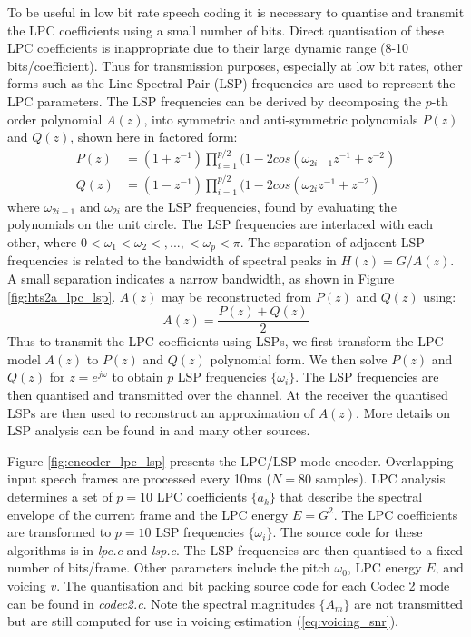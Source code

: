 \documentclass{article}
\begin{document}
{To be useful in low bit rate speech coding it is necessary to quantise and transmit the LPC coefficients using a small number of bits. Direct quantisation of these LPC coefficients is inappropriate due to their large dynamic range (8-10 bits/coefficient). Thus for transmission purposes, especially at low bit rates, other forms such as the Line Spectral Pair (LSP) \cite{itakura1975line} frequencies are used to represent the LPC parameters. The LSP frequencies can be derived by decomposing the $p$-th order polynomial $A(z)$, into symmetric and anti-symmetric polynomials $P(z)$ and $Q(z)$, shown here in factored form:
\begin{equation}
\begin{split}
P(z) &= (1+z^{-1}) \prod_{i=1}^{p/2} (1 - 2cos(\omega_{2i-1} z^{-1} + z^{-2} ) \\
Q(z) &= (1-z^{-1}) \prod_{i=1}^{p/2} (1 - 2cos(\omega_{2i} z^{-1} + z^{-2} )
\end{split}
\end{equation}
where $\omega_{2i-1}$ and $\omega_{2i}$ are the LSP frequencies, found by evaluating the polynomials on the unit circle. The LSP frequencies are interlaced with each other, where $0<\omega_1 < \omega_2 <,..., < \omega_p < \pi$. The separation of adjacent LSP frequencies is related to the bandwidth of spectral peaks in $H(z)=G/A(z)$. A small separation indicates a narrow bandwidth, as shown in Figure \ref{fig:hts2a_lpc_lsp}. $A(z)$ may be reconstructed from $P(z)$ and $Q(z)$ using:
\begin{equation}
A(z) = \frac{P(z)+Q(z)}{2}
\end{equation}
Thus to transmit the LPC coefficients using LSPs, we first transform the LPC model $A(z)$ to $P(z)$ and $Q(z)$ polynomial form. We then solve $P(z)$ and $Q(z)$ for $z=e^{j \omega}$ to obtain $p$ LSP frequencies $\{\omega_i\}$. The LSP frequencies are then quantised and transmitted over the channel. At the receiver the quantised LSPs are then used to reconstruct an approximation of $A(z)$.  More details on LSP analysis can be found in \cite{rowe1997techniques} and many other sources.

Figure \ref{fig:encoder_lpc_lsp} presents the LPC/LSP mode encoder. Overlapping input speech frames are processed every 10ms ($N=80$ samples).  LPC analysis determines a set of $p=10$ LPC coefficients $\{a_k\}$ that describe the spectral envelope of the current frame and the LPC energy $E=G^2$. The LPC coefficients are transformed to $p=10$ LSP frequencies $\{\omega_i\}$. The source code for these algorithms is in \emph{lpc.c} and \emph{lsp.c}.  The LSP frequencies are then quantised to a fixed number of bits/frame.  Other parameters include the pitch $\omega_0$, LPC energy $E$, and voicing $v$.  The quantisation and bit packing source code for each Codec 2 mode can be found in \emph{codec2.c}.  Note the spectral magnitudes $\{A_m\}$ are not transmitted but are still computed for use in voicing estimation (\ref{eq:voicing_snr}).

}
\end{document}
